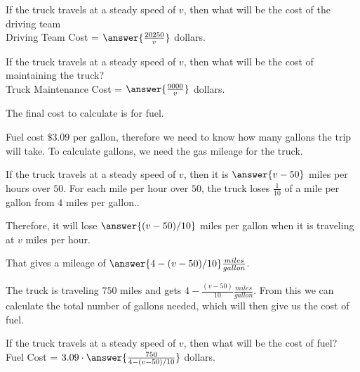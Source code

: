 \documentclass{ximera}
\begin{document}
\begin{question} 


If the truck travels at a steady speed of $v$, then what will be the cost of the driving team \\

Driving Team Cost = $\answer{\frac{20250}{v}}$ dollars.
\end{question}




\begin{question} 


If the truck travels at a steady speed of $v$, then what will be the cost of maintaining the truck? \\

Truck Maintenance Cost = $\answer{\frac{9000}{v}}$ dollars.
\end{question}



The final cost to calculate is for fuel.

Fuel cost $\$3.09$ per gallon, therefore we need to know how many gallons the trip will take. To calculate gallons, we need the gas mileage for the truck.


\begin{explanation}

If the truck travels at a steady speed of $v$, then it is $\answer{v-50}$ miles per hours over $50$. For each mile per hour over $50$, the truck loses $\frac{1}{10}$ of a mile per gallon from $4$ miles per gallon..

Therefore, it will lose $\answer{(v-50)/10}$ miles per gallon when it is traveling at $v$ miles per hour.

That gives a mileage of $\answer{4-(v-50)/10} \frac{miles}{gallon}$.

\end{explanation}


The truck is traveling $750$ miles and gets $4-\frac{(v-50)}{10} \frac{miles}{gallon}$. From this we can calculate the total number of gallons needed, which will then give us the cost of fuel.






\begin{question} 


If the truck travels at a steady speed of $v$, then what will be the cost of fuel? \\

Fuel Cost = $ 3.09 \cdot \answer{\frac{750}{4-(v-50)/10}}$ dollars.
\end{question}
\end{document}
